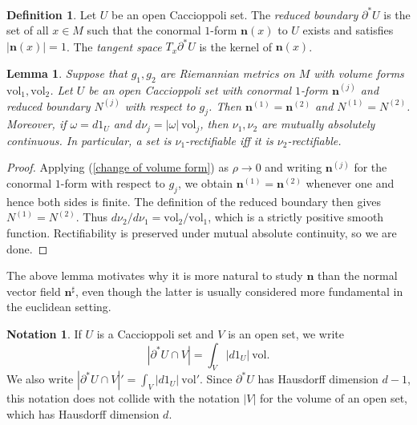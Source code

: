 \documentclass[reqno,12pt,letterpaper]{amsart}
\newcommand{\normal}{\mathbf n}
\newcommand{\vol}{\mathrm{vol}}
\newcommand{\dfn}[1]{\emph{#1}\index{#1}}
\newtheorem{lemma}[theorem]{Lemma}
\theoremstyle{definition}
\newtheorem{definition}[theorem]{Definition}
\newtheorem{notation}[theorem]{Notation}
\numberwithin{equation}{section}
\begin{document}
\begin{definition}
Let $U$ be an open Caccioppoli set.
The \dfn{reduced boundary} $\partial^* U$ is the set of all $x \in M$ such that the conormal $1$-form $\normal(x)$ to $U$ exists and satisfies $|\normal(x)| = 1$.
The \dfn{tangent space} $T_x\partial^* U$ is the kernel of $\normal(x)$.
\end{definition}

\begin{lemma}\label{reduced boundary is metricfree}
Suppose that $g_1,g_2$ are Riemannian metrics on $M$ with volume forms $\vol_1,\vol_2$.
Let $U$ be an open Caccioppoli set with conormal $1$-form $\normal^{(j)}$ and reduced boundary $N^{(j)}$ with respect to $g_j$.
Then $\normal^{(1)} = \normal^{(2)}$ and $N^{(1)} = N^{(2)}$.
Moreover, if $\omega = d1_U$ and $d\nu_j = |\omega| ~\vol_j$, then $\nu_1,\nu_2$ are mutually absolutely continuous.
In particular, a set is $\nu_1$-rectifiable iff it is $\nu_2$-rectifiable.
\end{lemma}
\begin{proof}
Applying (\ref{change of volume form}) as $\rho \to 0$ and writing $\normal^{(j)}$ for the conormal $1$-form with respect to $g_j$, we obtain $\normal^{(1)} = \normal^{(2)}$
whenever one and hence both sides is finite.
The definition of the reduced boundary then gives $N^{(1)} = N^{(2)}$.
Thus $d\nu_2/d\nu_1 = \vol_2/\vol_1$, which is a strictly positive smooth function.
Rectifiability is preserved under mutual absolute continuity, so we are done.
\end{proof}

The above lemma motivates why it is more natural to study $\normal$ than the normal vector field $\normal^\sharp$, even though the latter is usually considered more fundamental in the euclidean setting.

\begin{notation}
If $U$ is a Caccioppoli set and $V$ is an open set, we write
$$|\partial^* U \cap V| = \int_V |d1_U| ~\vol.$$
We also write $|\partial^* U \cap V|' = \int_V |d1_U| ~\vol'$.
Since $\partial^* U$ has Hausdorff dimension $d - 1$, this notation does not collide with the notation $|V|$ for the volume of an open set, which has Hausdorff dimension $d$.
\end{notation}
\end{document}
